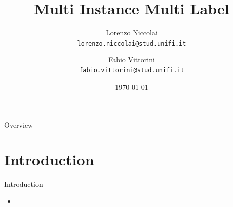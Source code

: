 \documentclass{beamer}
\title[MIML]{Multi Instance Multi Label}
\institute[]{{\large Machine Learning}\\\vspace{0.3cm}\textit{University of Florence, Department of Information Engineering}}
\author[L. Niccolai, F. Vittorini]
{\parbox[c]{1.5in}{Lorenzo Niccolai\\\texttt{\tiny lorenzo.niccolai@stud.unifi.it}} \and 
	\parbox[c]{1.5in}{Fabio Vittorini\\\texttt{\tiny fabio.vittorini@stud.unifi.it}}}
\date{\today}
\begin{document}
	
	
\frame[plain]{\titlepage} %

\usebackgroundtemplate
{
}


\begin{frame}{Overview}
	\tableofcontents
\end{frame}

\section{Introduction}
\begin{frame}{Introduction}
	\begin{itemize}\setlength\itemsep{1em}
		\item 
		
	\end{itemize}
\end{frame}

	
\end{document}
